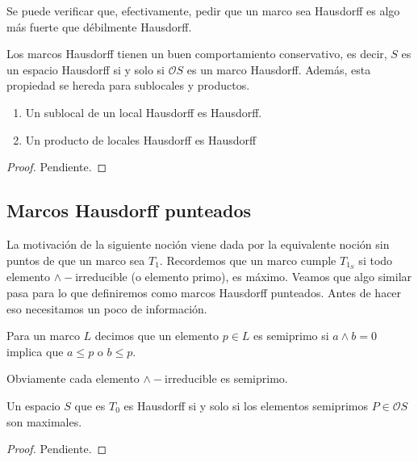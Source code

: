 Se puede verificar que, efectivamente, pedir que un marco sea Hausdorff es algo más fuerte que débilmente Hausdorff.\\

\begin{obs}\label{Observacion3.4.1}
Los marcos Hausdorff tienen un buen comportamiento conservativo, es decir, $S$ es un espacio Hausdorff si y solo si $\mathcal{O}S$ es un marco Hausdorff. Además, esta propiedad se hereda para sublocales y productos.
\end{obs}

\begin{prop}\label{Heredar H}
    \begin{enumerate}
        \item Un sublocal de un local Hausdorff es Hausdorff.
        \item Un producto de locales Hausdorff es Hausdorff
    \end{enumerate}
\end{prop}

\begin{proof}
    Pendiente.
\end{proof}

\subsection{Marcos Hausdorff punteados}

La motivación de la siguiente noción viene dada por la equivalente noción sin puntos de que un marco sea $T_1$. Recordemos que un marco cumple $T_{1_S}$ si todo elemento $\wedge-$irreducible (o elemento primo), es máximo. Veamos que algo similar pasa para lo que definiremos como marcos Hausdorff punteados. Antes de hacer eso necesitamos un poco de información.

\begin{dfn}\label{Semiprimo}
    Para un marco $L$ decimos que un elemento $p\in L$ es semiprimo si $a\wedge b=0$ implica que $a\leq p$ o $b\leq p$.
\end{dfn}

Obviamente cada elemento $\wedge-$irreducible es semiprimo. 

\begin{prop}\label{Proposicion4.1.1}
    Un espacio $S$ que es $T_0$ es Hausdorff si y solo si los elementos semiprimos $P\in \mathcal{O}S$ son maximales.
\end{prop}

\begin{proof}
    Pendiente.
\end{proof}

